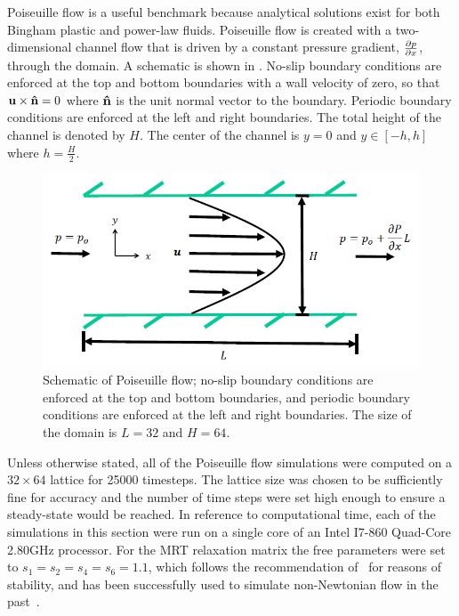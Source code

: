 Poiseuille flow is a useful benchmark because analytical solutions exist for both Bingham plastic and power-law fluids.
Poiseuille flow is created with a two-dimensional channel flow that is driven by a constant pressure gradient, $\frac{\partial p}{\partial x}$, through the domain.
A schematic is shown in .
No-slip boundary conditions are enforced at the top and bottom boundaries with a wall velocity of zero, so that $\mathbf{u} \times \mathbf{\hat{n}} = 0$ where $\mathbf{\hat{n}}$ is the unit normal vector to the boundary. 
Periodic boundary conditions are enforced at the left and right boundaries.
The total height of the channel is denoted by $H$.
The center of the channel is $y = 0$ and $y \in [-h, h]$ where $h = \frac{H}{2}$.

\begin{figure}
	\centering
    \includegraphics[width=\linewidth]{figs/poise-schematic}
    \caption{Schematic of Poiseuille flow; no-slip boundary conditions are enforced at the top and bottom boundaries, and periodic boundary conditions are enforced at the left and right boundaries.
The size of the domain is $L = 32$  and $H = 64$.}
    \label{fig:poise-schematic}
\end{figure}

Unless otherwise stated, all of the Poiseuille flow simulations were computed on a $32 \times 64$ lattice for 25000 timesteps.
The lattice size was chosen to be sufficiently fine for accuracy and the number of time steps were set high enough to ensure a steady-state would be reached.
In reference to computational time, each of the simulations in this section were run on a single core of an Intel I7-860 Quad-Core 2.80GHz processor.
For the MRT relaxation matrix the free parameters were set to $s_1 = s_2 = s_4 = s_6 = 1.1$, which follows the recommendation of~\cite{lallemand2000theory} for reasons of stability, and has been successfully used to simulate non-Newtonian flow in the past~\cite{fallah2012multiple,grasinger2015simulation}.

